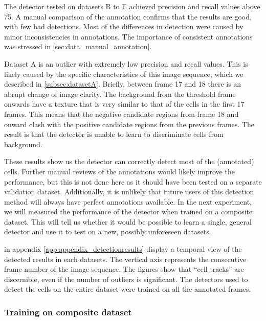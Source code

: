 		The detector tested on datasets B to E achieved precision and recall values above 75. A manual comparison of the annotation confirms that the results are good, with few bad detections. Most of the differences in detection were caused by minor inconsistencies in annotations. The importance of consistent annotations was stressed in \cref{sec:data_manual_annotation}.
		
		Dataset A is an outlier with extremely low precision and recall values. This is likely caused by the specific characteristics of this image sequence, which we described in \cref{subsec:datasetA}. Briefly, between frame 17 and 18 there is an abrupt change of image clarity. The background from the threshold frame onwards have a texture that is very similar to that of the cells in the first 17 frames. This means that the negative candidate regions from frame 18 and onward clash with the positive candidate regions from the previous frames. The result is that the detector is unable to learn to discriminate cells from background.
		
		These results show us the detector can correctly detect most of the (annotated) cells. Further manual reviews of the annotations would likely improve the performance, but this is not done here as it should have been tested on a separate validation dataset. Additionally, it is unlikely that future users of this detection method will always have perfect annotations available. In the next experiment, we will measured the performance of the detector when trained on a composite dataset. This will tell us whether it would be possible to learn a single, general detector and use it to test on a new, possibly unforeseen datasets.

		 in appendix \ref{app:appendix_detectionresults} display a temporal view of the detected results in each datasets. The vertical axis represents the consecutive frame number of the image sequence. The figures show that ``cell tracks'' are discernible, even if the number of outliers is significant. The detectors used to detect the cells on the entire dataset were trained on all the annotated frames. 

		\subsubsection{Training on composite dataset}
		
